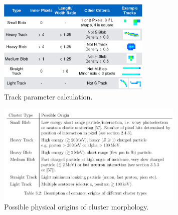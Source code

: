 \begin{figure}[H]
	\begin{center}
	\includegraphics[width=0.65\textwidth]{figures/stuartgraphic.pdf}
	\caption{Track parameter calculation.}
	\label{stuart_algo}
	\end{center}
\end{figure}

\begin{figure}[H]
	\begin{center}
	\includegraphics[width=0.8\textwidth]{figures/cluster_types.png}
	\caption{Possible physical origins of cluster morphology.}
	\label{tracks}
	\end{center}
\end{figure}
